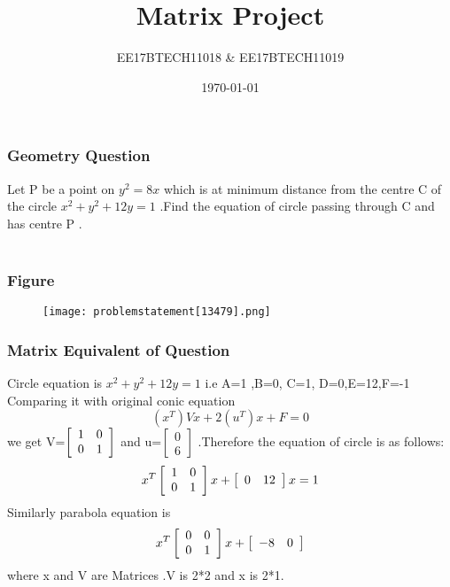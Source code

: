 \documentclass{beamer}
\title[Short title]{Matrix Project } %
\author{EE17BTECH11018 \& EE17BTECH11019} %
\institute[IIT Hyderabad] %
{
IIT Hyderabad \\ %
\medskip
\textit{EE 1390-INTRO to AI and ML} 
}
\date{\today} %
\begin{document}
\begin{frame}
\titlepage %
\end{frame}




\begin{frame}
\frametitle{Geometry Question}
Let P be a point on $ y^2=8x $ which is at minimum distance from the centre C of the circle $x^2+y^2+12y=1$ .Find the equation of circle passing through C and has centre P  .\\~\\


\end{frame}

\begin{frame}
\frametitle{Figure}
\begin{figure}
\texttt{[image: problemstatement[13479].png]}
\end{figure}
\end{frame}


\begin{frame}
\frametitle{Matrix Equivalent of Question}
Circle equation is  $x^2+y^2+12y=1$ i.e A=1 ,B=0, C=1, D=0,E=12,F=-1
Comparing it with original conic equation $$(x^T)Vx+2(u^T)x+F=0$$
we get V=$ \left[ 
  \begin{array}{ c c }
     1& 0\\
     0 & 1
  \end{array} \right]$ and u=$ \left[
  \begin{array}{ c }
     0 \\
     6
  \end{array} \right]$
 .Therefore  the equation of circle is as follows:
\[
x^T \left[
  \begin{array}{ c c }
     1 & 0 \\
     0& 1
  \end{array} \right]
x+ \left[
  \begin{array}{ c c }
     0 & 12 \\
     
  \end{array} \right]
x=1
\]
Similarly parabola equation is 
\[ x^T \left[
  \begin{array}{ c c }
     0 & 0\\
     0 & 1
  \end{array} \right]
x+ \left[
  \begin{array}{ c c }
     -8&0 \\
    
  \end{array} \right]
\]
where x and V are Matrices .V is 2*2 and x is 2*1.

\end{frame}
\end{document}
